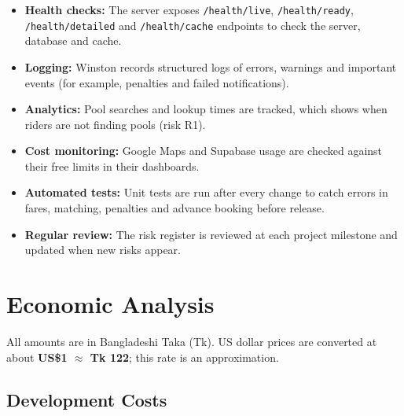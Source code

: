 \begin{itemize}
  \item \textbf{Health checks:} The server exposes \texttt{/health/live},
        \texttt{/health/ready}, \texttt{/health/detailed} and
        \texttt{/health/cache} endpoints to check the server, database and
        cache.
  \item \textbf{Logging:} Winston records structured logs of errors, warnings
        and important events (for example, penalties and failed
        notifications).
  \item \textbf{Analytics:} Pool searches and lookup times are tracked, which
        shows when riders are not finding pools (risk R1).
  \item \textbf{Cost monitoring:} Google Maps and Supabase usage are checked
        against their free limits in their dashboards.
  \item \textbf{Automated tests:} Unit tests are run after every change to
        catch errors in fares, matching, penalties and advance booking before
        release.
  \item \textbf{Regular review:} The risk register is reviewed at each project
        milestone and updated when new risks appear.
\end{itemize}

\section{Economic Analysis}
\label{sec:economic-analysis}

All amounts are in Bangladeshi Taka (Tk). US dollar prices are converted at
about \textbf{US\$1 $\approx$ Tk 122}; this rate is an approximation.

\subsection{Development Costs}
\label{subsec:dev-costs}

